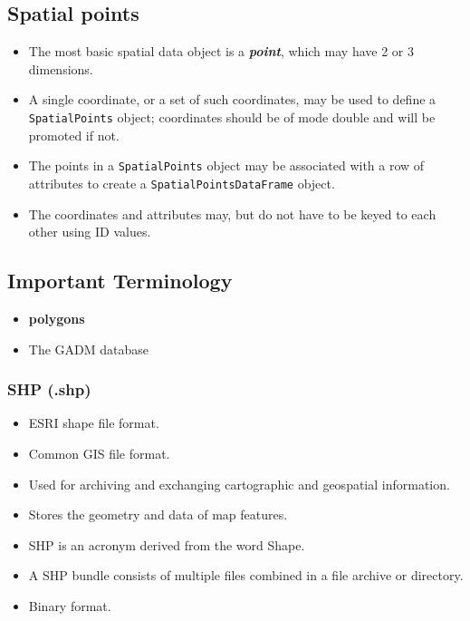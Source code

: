 \documentclass[12pt]{article}
\begin{document}

\subsection*{Spatial points}
\begin{itemize}
\item The most basic spatial data object is a \textit{\textbf{point}}, which may have
2 or 3 dimensions.
\item A single coordinate, or a set of such coordinates, may be used
to define a \texttt{SpatialPoints} object; coordinates should be of
mode double and will be promoted if not.
\item The points in a \texttt{SpatialPoints} object may be associated with
a row of attributes to create a \texttt{SpatialPointsDataFrame} object.
\item The coordinates and attributes may, but do not have to be
keyed to each other using ID values.
\end{itemize}




\subsection*{Important Terminology}


\begin{itemize}
\item \textbf{polygons}
\item The GADM database
\end{itemize}

\subsubsection{SHP (.shp)}

\begin{itemize}
\item ESRI shape file format.
\item Common GIS file format.
\item Used for archiving and exchanging cartographic and geospatial information.
\item Stores the geometry and data of map features.
\item SHP is an acronym derived from the word Shape.
\item A SHP bundle consists of multiple files combined in a file archive or directory.
\item Binary format.
\end{itemize}
\end{document}
